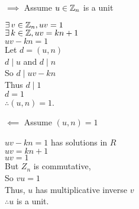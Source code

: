 \documentclass[letterpaper,12pt,fleqn]{article}
\begin{document}
\begin{theproof}
  \listbreak
  \begin{description}
    \begin{minipage}[t]{3in}
    \item $\implies$ Assume $u\in\mathbb{Z}_n$ is a unit

      $\exists\,v\in\mathbb{Z}_n,uv=1$ \\
      $\exists\,k\in\mathbb{Z},uv=kn+1$ \\
      $uv-kn=1$ \\
      Let $d=(u,n)$ \\
      $d\mid u$ and $d\mid n$ \\
      So $d\mid uv-kn$ \\
      Thus $d\mid 1$ \\
      $d=1$ \\
      $\therefore (u,n)=1$.
    \end{minipage}
    \begin{minipage}[t]{3in}
    \item $\impliedby$ Assume $(u,n)=1$

      $uv-kn=1$ has solutions in $R$ \\
      $uv=kn+1$ \\
      $uv=1$ \\
      But $Z_n$ is commutative, \\
      So $vu=1$ \\
      Thus, $u$ has multiplicative inverse $v$ \\
      $\therefore u$ is a unit.
    \end{minipage}
  \end{description}
\end{theproof}
\end{document}

